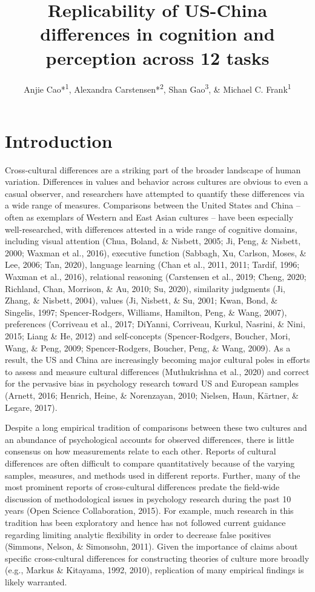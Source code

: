 \documentclass[
  man]{apa6}
\title{Replicability of US-China differences in cognition and perception across 12 tasks}
\author{Anjie Cao*\textsuperscript{1}, Alexandra Carstensen*\textsuperscript{2}, Shan Gao\textsuperscript{3}, \& Michael C. Frank\textsuperscript{1}}
\date{}
\affiliation{\vspace{0.5cm}\textsuperscript{1} Department of Psychology, Stanford University\\\textsuperscript{2} Department of Psychology, University of California, San Diego\\\textsuperscript{3} FIXME}
\begin{document}
\maketitle

\hypertarget{introduction}{%
\section{Introduction}\label{introduction}}

Cross-cultural differences are a striking part of the broader landscape of human variation. Differences in values and behavior across cultures are obvious to even a casual observer, and researchers have attempted to quantify these differences via a wide range of measures. Comparisons between the United States and China -- often as exemplars of Western and East Asian cultures -- have been especially well-researched, with differences attested in a wide range of cognitive domains, including visual attention (Chua, Boland, \& Nisbett, 2005; Ji, Peng, \& Nisbett, 2000; Waxman et al., 2016), executive function (Sabbagh, Xu, Carlson, Moses, \& Lee, 2006; Tan, 2020), language learning (Chan et al., 2011, 2011; Tardif, 1996; Waxman et al., 2016), relational reasoning (Carstensen et al., 2019; Cheng, 2020; Richland, Chan, Morrison, \& Au, 2010; Su, 2020), similarity judgments (Ji, Zhang, \& Nisbett, 2004), values (Ji, Nisbett, \& Su, 2001; Kwan, Bond, \& Singelis, 1997; Spencer-Rodgers, Williams, Hamilton, Peng, \& Wang, 2007), preferences (Corriveau et al., 2017; DiYanni, Corriveau, Kurkul, Nasrini, \& Nini, 2015; Liang \& He, 2012) and self-concepts (Spencer-Rodgers, Boucher, Mori, Wang, \& Peng, 2009; Spencer-Rodgers, Boucher, Peng, \& Wang, 2009). As a result, the US and China are increasingly becoming major cultural poles in efforts to assess and measure cultural differences (Muthukrishna et al., 2020) and correct for the pervasive bias in psychology research toward US and European samples (Arnett, 2016; Henrich, Heine, \& Norenzayan, 2010; Nielsen, Haun, Kärtner, \& Legare, 2017).

Despite a long empirical tradition of comparisons between these two cultures and an abundance of psychological accounts for observed differences, there is little consensus on how measurements relate to each other. Reports of cultural differences are often difficult to compare quantitatively because of the varying samples, measures, and methods used in different reports. Further, many of the most prominent reports of cross-cultural differences predate the field-wide discussion of methodological issues in psychology research during the past 10 years (Open Science Collaboration, 2015). For example, much research in this tradition has been exploratory and hence has not followed current guidance regarding limiting analytic flexibility in order to decrease false positives (Simmons, Nelson, \& Simonsohn, 2011). Given the importance of claims about specific cross-cultural differences for constructing theories of culture more broadly (e.g., Markus \& Kitayama, 1992, 2010), replication of many empirical findings is likely warranted.
\end{document}
